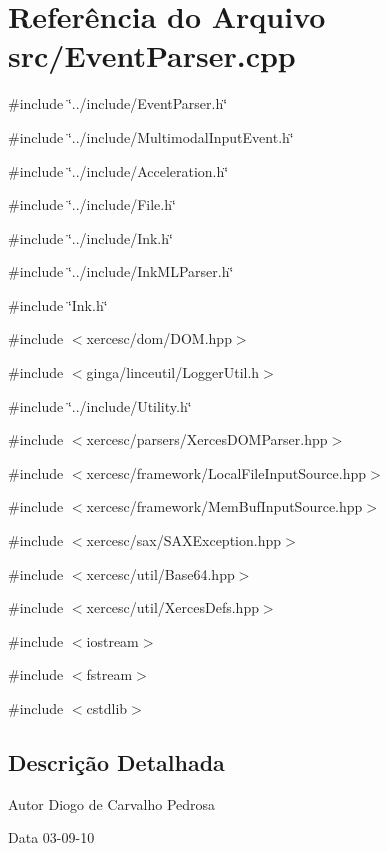 \section{Referência do Arquivo src/EventParser.cpp}
\label{EventParser_8cpp}
{\ttfamily \#include \char`\"{}../include/EventParser.h\char`\"{}}\par
{\ttfamily \#include \char`\"{}../include/MultimodalInputEvent.h\char`\"{}}\par
{\ttfamily \#include \char`\"{}../include/Acceleration.h\char`\"{}}\par
{\ttfamily \#include \char`\"{}../include/File.h\char`\"{}}\par
{\ttfamily \#include \char`\"{}../include/Ink.h\char`\"{}}\par
{\ttfamily \#include \char`\"{}../include/InkMLParser.h\char`\"{}}\par
{\ttfamily \#include \char`\"{}Ink.h\char`\"{}}\par
{\ttfamily \#include $<$xercesc/dom/DOM.hpp$>$}\par
{\ttfamily \#include $<$ginga/linceutil/LoggerUtil.h$>$}\par
{\ttfamily \#include \char`\"{}../include/Utility.h\char`\"{}}\par
{\ttfamily \#include $<$xercesc/parsers/XercesDOMParser.hpp$>$}\par
{\ttfamily \#include $<$xercesc/framework/LocalFileInputSource.hpp$>$}\par
{\ttfamily \#include $<$xercesc/framework/MemBufInputSource.hpp$>$}\par
{\ttfamily \#include $<$xercesc/sax/SAXException.hpp$>$}\par
{\ttfamily \#include $<$xercesc/util/Base64.hpp$>$}\par
{\ttfamily \#include $<$xercesc/util/XercesDefs.hpp$>$}\par
{\ttfamily \#include $<$iostream$>$}\par
{\ttfamily \#include $<$fstream$>$}\par
{\ttfamily \#include $<$cstdlib$>$}\par


\subsection{Descrição Detalhada}
\begin{DoxyAuthor}{Autor}
Diogo de Carvalho Pedrosa 
\end{DoxyAuthor}
\begin{DoxyDate}{Data}
03-\/09-\/10 
\end{DoxyDate}
